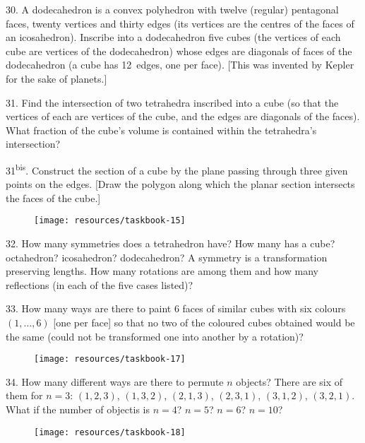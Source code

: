 \begin{problem}{30.}
A dodecahedron is a convex polyhedron with twelve (regular) pentagonal
faces, twenty vertices
and thirty edges (its vertices are the centres of the faces of an icosahedron).
Inscribe into a dodecahedron five cubes (the vertices of each cube are vertices of the dodecahedron)
whose edges are diagonals of faces of the dodecahedron (a cube has 12~edges, one per face).
	[This was invented by Kepler for the sake of planets.]
\end{problem}

\begin{problem}{31.}
Find the intersection of two tetrahedra inscribed into a cube (so that the vertices of each are
vertices of the cube, and the edges are diagonals of the faces).
What fraction of the cube's volume is contained within the tetrahedra's intersection?
\end{problem}

\begin{problem}{31\textsuperscript{bis}.}
Construct the section of a cube by the plane passing through three given points on the edges.
	[Draw the polygon along which the planar section intersects the faces of the cube.]
\begin{figure}
	\texttt{[image: resources/taskbook-15]}
\end{figure}
\end{problem}

\begin{problem}{32.}
How many symmetries does a tetrahedron have? How many has a cube? octahedron? icosahedron?
dodecahedron? A symmetry is a transformation preserving lengths.
How many rotations are among them and how many reflections (in each of the five cases listed)?
\end{problem}

\begin{problem}{33.}
How many ways are there to paint $6$ faces of similar cubes with six colours $(1,\dotsc,6)$ [one per face]
so that no two of the coloured cubes obtained would be the same (could not be transformed one into another
by a rotation)?
\begin{figure}
	\texttt{[image: resources/taskbook-17]}
\end{figure}
\end{problem}

\begin{problem}{34.}
How many different ways are there to permute $n$ objects?
There are six of them for $n=3$: $(1,2,3)$, $(1,3,2)$, $(2,1,3)$, $(2,3,1)$, $(3,1,2)$, $(3,2,1)$. What if the number of objectis is $n=4$? $n=5$? $n=6$? $n=10$?
\begin{figure}
	\texttt{[image: resources/taskbook-18]}
\end{figure}
\end{problem}

